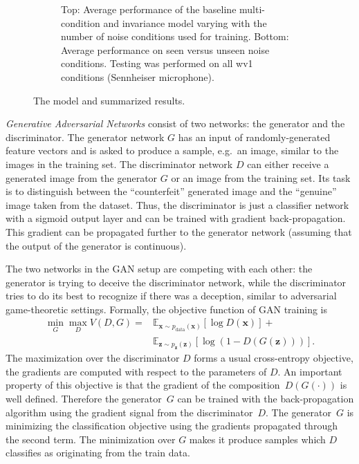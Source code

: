 \documentclass[a4paper]{article}
\begin{document}
\begin{figure}
\begin{subfigure}[b]{0.5\linewidth}
        \caption{Top: Average performance of the baseline multi-condition and invariance model varying with  the number of noise
            conditions used for training. Bottom: Average performance on seen versus unseen noise conditions.
            Testing was performed on all wv1 conditions (Sennheiser microphone).
            }
        \label{fig:results}
    \end{subfigure}
    \caption{The model and summarized results.}
\end{figure}
\emph{Generative Adversarial Networks} consist of two networks: the generator and the discriminator. 
    The generator network $G$ has an
    input of randomly-generated feature vectors and is asked to produce a
    sample, e.g.\ an image, similar to the images in the training set. The discriminator network $D$
    can either receive a generated image from the generator $G$ or an image
    from the training set. Its task is to distinguish
    between the ``counterfeit'' generated image and the ``genuine'' image taken from the dataset. Thus,
    the discriminator is just a classifier network with a sigmoid output layer
    and can be trained with gradient back-propagation. This gradient can be propagated further
    to the generator network (assuming that the output of the generator is
    continuous).

    The two networks in the GAN setup are competing with each other: the 
    generator is trying to deceive the discriminator network, while the discriminator tries
    to do its best to recognize if there was a deception, similar to adversarial game-theoretic settings.    
    Formally, the objective function of GAN training is
    \begin{align}
        \min_G \max_D V(D, G) = &\mathbb{E}_{\bm{x} \sim p_{\text{data}}(\bm{x})}[\log D(\bm{x})] + \\
            &\mathbb{E}_{\bm{z} \sim p_{\bm{z}}(\bm{z})}[\log (1 - D(G(\bm{z})))].
        \label{eq:gan}
    \end{align}
    The maximization over the discriminator $D$ forms a usual cross-entropy objective, the gradients are
    computed with respect to the parameters of $D$. An important property of
    this objective is that the gradient of the composition~$D(G(\cdot))$ is well
    defined. Therefore the generator~$G$ can be trained with the back-propagation
    algorithm using the gradient signal from the discriminator~$D$.
    The generator~$G$ is
    minimizing the classification objective using the gradients
    propagated through the second term. The minimization over $G$ makes it
    produce samples which $D$ classifies as originating from the train data.
\end{document}
